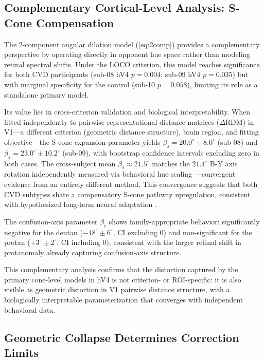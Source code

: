 \documentclass{article}
\begin{document}
\subsection{Complementary Cortical-Level Analysis: S-Cone Compensation}

The 2-component angular dilation model (\cref{eq:2comp}) provides a complementary perspective by operating directly in opponent hue space rather than modeling retinal spectral shifts.
Under the LOCO criterion, this model reaches significance for both CVD participants (sub-08 hV4 $p = 0.004$; sub-09 hV4 $p = 0.035$) but with marginal specificity for the control (sub-10 $p = 0.058$), limiting its role as a standalone primary model.

Its value lies in cross-criterion validation and biological interpretability.
When fitted independently to pairwise representational distance matrices ($\Delta$RDM) in V1---a different criterion (geometric distance structure), brain region, and fitting objective---the S-cone expansion parameter yields $\beta_s = 20.0^\circ \pm 8.0^\circ$ (sub-08) and $\beta_s = 23.0^\circ \pm 10.2^\circ$ (sub-09), with bootstrap confidence intervals excluding zero in both cases.
The cross-subject mean $\beta_s \approx 21.5^\circ$ matches the $21.4^\circ$ B-Y axis rotation independently measured via behavioral hue-scaling \citep{emery2021}---convergent evidence from an entirely different method.
This convergence suggests that both CVD subtypes share a compensatory S-cone pathway upregulation, consistent with hypothesized long-term neural adaptation \citep{tregillus2021, boehm2014}.

The confusion-axis parameter $\beta_c$ shows family-appropriate behavior: significantly negative for the deutan ($-18^\circ \pm 6^\circ$, CI excluding 0) and non-significant for the protan ($+3^\circ \pm 2^\circ$, CI including 0), consistent with the larger retinal shift in protanomaly already capturing confusion-axis structure.

This complementary analysis confirms that the distortion captured by the primary cone-level models in hV4 is not criterion- or ROI-specific: it is also visible as geometric distortion in V1 pairwise distance structure, with a biologically interpretable parameterization that converges with independent behavioral data.

\subsection{Geometric Collapse Determines Correction Limits}
\end{document}
